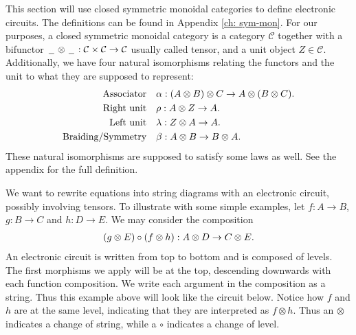 \documentclass[../thesis.tex]{subfiles}
\begin{document}
            This section will use closed symmetric monoidal categories to define electronic circuits. The definitions can be found in Appendix \ref{ch: sym-mon}. For our purposes, a closed symmetric monoidal category is a category $\mathcal{C}$ together with a bifunctor $\argument\otimes\argument: \mathcal{C}\times\mathcal{C}\rightarrow\mathcal{C}$ usually called tensor, and a unit object $Z\in \mathcal{C}$. Additionally, we have four natural isomorphisms relating the functors and the unit to what they are supposed to represent:
            \begin{align*}
                \tt{Associator} & \quad \alpha : (A \otimes B) \otimes C \rightarrow A \otimes (B \otimes C)\tt{.}\\
                \tt{Right unit} & \quad \rho : A \otimes Z \rightarrow A\tt{.}\\
                \tt{Left unit} & \quad \lambda : Z \otimes A \rightarrow A\tt{.}\\
                \tt{Braiding/Symmetry} & \quad \beta : A \otimes B \rightarrow B \otimes A\tt{.}
            \end{align*}
            These natural isomorphisms are supposed to satisfy some laws as well. See the appendix for the full definition.

            We want to rewrite equations into string diagrams with an electronic circuit, possibly involving tensors. To illustrate with some simple examples, let $f: A \rightarrow B$, $g: B \rightarrow C$ and $h : D \rightarrow E$. We may consider the composition
            \begin{align*}
                (g \otimes E) \circ (f \otimes h) : A \otimes D \rightarrow C \otimes E \tt{.}
            \end{align*}
            An electronic circuit is written from top to bottom and is composed of levels. The first morphisms we apply will be at the top, descending downwards with each function composition. We write each argument in the composition as a string. Thus this example above will look like the circuit below. Notice how $f$ and $h$ are at the same level, indicating that they are interpreted as $f \otimes h$. Thus an $\otimes$ indicates a change of string, while a $\circ$ indicates a change of level.
            
\end{document}
